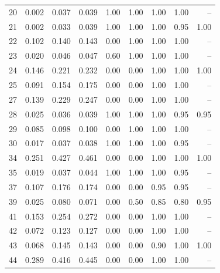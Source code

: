 \begin{longtable}{@{}rrrrrrrrr@{}}
20 & 0.002 & 0.037 & 0.039 & 1.00 & 1.00 & 1.00 & 1.00 & --\\
21 & 0.002 & 0.033 & 0.039 & 1.00 & 1.00 & 1.00 & 0.95 & 1.00\\
22 & 0.102 & 0.140 & 0.143 & 0.00 & 1.00 & 1.00 & 1.00 & --\\
23 & 0.020 & 0.046 & 0.047 & 0.60 & 1.00 & 1.00 & 1.00 & --\\
24 & 0.146 & 0.221 & 0.232 & 0.00 & 0.00 & 1.00 & 1.00 & 1.00\\
25 & 0.091 & 0.154 & 0.175 & 0.00 & 0.00 & 1.00 & 1.00 & --\\
27 & 0.139 & 0.229 & 0.247 & 0.00 & 0.00 & 1.00 & 1.00 & --\\
28 & 0.025 & 0.036 & 0.039 & 1.00 & 1.00 & 1.00 & 0.95 & 0.95\\
29 & 0.085 & 0.098 & 0.100 & 0.00 & 1.00 & 1.00 & 1.00 & --\\
30 & 0.017 & 0.037 & 0.038 & 1.00 & 1.00 & 1.00 & 0.95 & --\\
34 & 0.251 & 0.427 & 0.461 & 0.00 & 0.00 & 1.00 & 1.00 & 1.00\\
35 & 0.019 & 0.037 & 0.044 & 1.00 & 1.00 & 1.00 & 0.95 & --\\
37 & 0.107 & 0.176 & 0.174 & 0.00 & 0.00 & 0.95 & 0.95 & --\\
39 & 0.025 & 0.080 & 0.071 & 0.00 & 0.50 & 0.85 & 0.80 & 0.95\\
41 & 0.153 & 0.254 & 0.272 & 0.00 & 0.00 & 1.00 & 1.00 & --\\
42 & 0.072 & 0.123 & 0.127 & 0.00 & 0.00 & 1.00 & 1.00 & --\\
43 & 0.068 & 0.145 & 0.143 & 0.00 & 0.00 & 0.90 & 1.00 & 1.00\\
44 & 0.289 & 0.416 & 0.445 & 0.00 & 0.00 & 1.00 & 1.00 & --\\
\bottomrule
\end{longtable}
